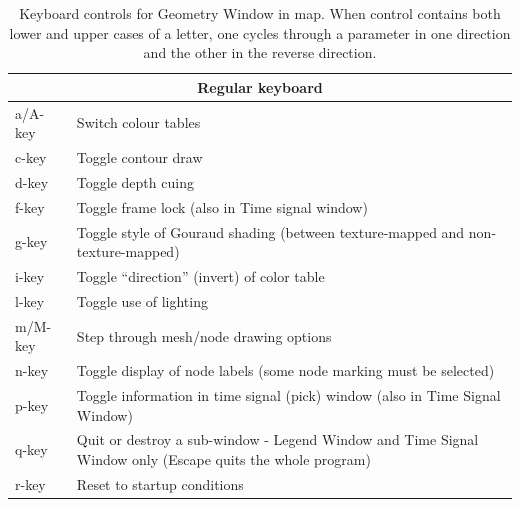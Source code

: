 \begin{table}[htbp]
        \caption{\label{table:keys} Keyboard controls for Geometry Window
          in map{}.  When control contains both lower and upper cases of a
          letter, one cycles through a parameter in one direction and the
          other in the reverse direction.}
    \begin{center}
        \begin{tabular}{|l|p{6in}|} \hline
        \multicolumn{2}{|c|}{\textbf{Regular keyboard}} \\ \hline
        a/A-key   &       Switch colour tables \\ \hline
        c-key   &       Toggle contour draw \\ \hline
        d-key   &       Toggle depth cuing\\ \hline
        f-key   &       Toggle frame lock (also in Time signal window)\\ \hline
       g-key   &       Toggle style of Gouraud shading (between
       texture-mapped and non-texture-mapped) \\ \hline 
        i-key   &       Toggle ``direction'' (invert) of color table\\ \hline
        l-key   &       Toggle use of lighting\\ \hline
        m/M-key   &       Step through mesh/node drawing options \\ \hline
        n-key   &       Toggle display of node labels (some node marking
        must be selected)\\ \hline 
        p-key   &       Toggle information in time signal (pick) window
         (also in Time Signal Window)\\ \hline 
         q-key   &       Quit or destroy a sub-window - Legend Window and
         Time Signal Window only (Escape quits the 
                         whole program) \\ \hline
        r-key   &       Reset to startup conditions \\ \hline

\end{tabular}
\end{center}
\end{table}
